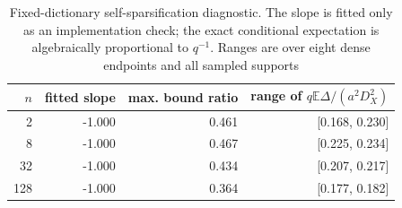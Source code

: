 \begin{table}[t]
\caption{Fixed-dictionary self-sparsification diagnostic. The slope is fitted only as an implementation check; the exact conditional expectation is algebraically proportional to $q^{-1}$. Ranges are over eight dense endpoints and all sampled supports}
\label{tab:self-sparsification}
\centering
\begin{tabular}{rrrr}
\toprule
$n$ & fitted slope & max. bound ratio & range of $q\mathbb E\Delta/(a^2D_X^2)$ \\
\midrule
2 & -1.000 & 0.461 & [0.168, 0.230] \\
8 & -1.000 & 0.467 & [0.225, 0.234] \\
32 & -1.000 & 0.434 & [0.207, 0.217] \\
128 & -1.000 & 0.364 & [0.177, 0.182] \\
\bottomrule
\end{tabular}
\end{table}
